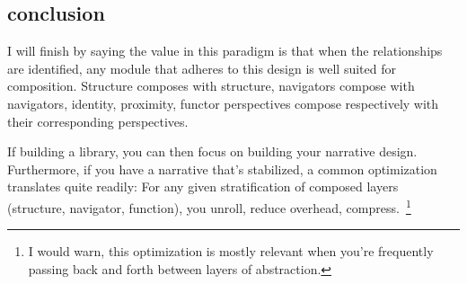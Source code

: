 \documentclass[twoside]{article}
\begin{document}
\subsection*{conclusion}

I will finish by saying the value in this paradigm is that when the relationships are identified, any module that
adheres to this design is well suited for composition. Structure composes with structure, navigators compose with
navigators, identity, proximity, functor perspectives compose respectively with their corresponding perspectives.

If building a library, you can then focus on building your narrative design. Furthermore, if you have a narrative
that's stabilized, a common optimization translates quite readily: For any given stratification of composed
layers (structure, navigator, function), you unroll, reduce overhead, compress.~\footnote{I would warn, this
optimization is mostly relevant when you're frequently passing back and forth between layers of abstraction.}
\end{document}
